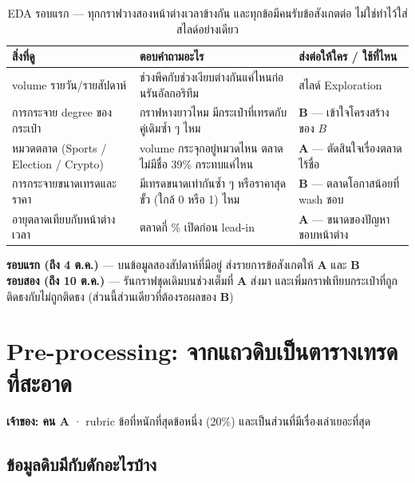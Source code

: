\documentclass[11pt,a4paper]{article}
\newcommand{\sansall}{\sffamily}
\newcommand{\en}[1]{#1}
\newcommand{\stg}[2]{\textcolor{#1}{\textbf{\en{#2}}}}
\newcommand{\rA}{\stg{accent}{A}}
\newcommand{\rB}{\stg{alg}{B}}
\newcommand{\thd}[1]{\sansall\bfseries #1}
\begin{document}
\begin{table}[H]
\centering\small
\begin{tabular}{L{3.6cm}L{5.8cm}L{4.8cm}}
\toprule
\thd{สิ่งที่ดู} & \thd{ตอบคำถามอะไร} & \thd{ส่งต่อให้ใคร / ใช้ที่ไหน} \\
\midrule
volume รายวัน/รายสัปดาห์ & ช่วงพีคกับช่วงเงียบต่างกันแค่ไหนก่อนรันอัลกอริทึม & สไลด์ Exploration \\
\addlinespace
การกระจาย degree ของกระเป๋า & กราฟหางยาวไหม มีกระเป๋าที่เทรดกับคู่เดิมซ้ำ ๆ ไหม & \rB{} --- เข้าใจโครงสร้างของ $B$ \\
\addlinespace
หมวดตลาด (Sports / Election / Crypto) & volume กระจุกอยู่หมวดไหน ตลาดไม่มีชื่อ 39\% กระทบแค่ไหน & \rA{} --- ตัดสินใจเรื่องตลาดไร้ชื่อ \\
\addlinespace
การกระจายขนาดเทรดและราคา & มีเทรดขนาดเท่ากันซ้ำ ๆ หรือราคาสุดขั้ว (ใกล้ 0 หรือ 1) ไหม & \rB{} --- ตลาดโอกาสน้อยที่ wash ชอบ \\
\addlinespace
อายุตลาดเทียบกับหน้าต่างเวลา & ตลาดกี่ \% เปิดก่อน lead-in & \rA{} --- ขนาดของปัญหาขอบหน้าต่าง \\
\bottomrule
\end{tabular}
\caption{EDA รอบแรก --- ทุกกราฟวางสองหน้าต่างเวลาข้างกัน
และทุกข้อมีคนรับข้อสังเกตต่อ ไม่ใช่ทำไว้ใส่สไลด์อย่างเดียว}
\end{table}

\begin{keybox}[title={EDA มีสองรอบ}]
\textbf{รอบแรก (ถึง 4 ต.ค.)} --- บนข้อมูลสองสัปดาห์ที่มีอยู่
ส่งรายการข้อสังเกตให้ \rA{} และ \rB{}\\[3pt]
\textbf{รอบสอง (ถึง 10 ต.ค.)} --- รันกราฟชุดเดิมบนช่วงเต็มที่ \rA{} ส่งมา
และเพิ่มกราฟเทียบกระเป๋าที่ถูกติดธงกับไม่ถูกติดธง (ส่วนนี้ส่วนเดียวที่ต้องรอผลของ \rB)
\end{keybox}

\section{Pre-processing: จากแถวดิบเป็นตารางเทรดที่สะอาด}
\label{sec:pre}

\textbf{เจ้าของ: คน \rA} · rubric ข้อที่หนักที่สุดข้อหนึ่ง (20\%) และเป็นส่วนที่มีเรื่องเล่าเยอะที่สุด

\subsection{ข้อมูลดิบมีกับดักอะไรบ้าง}
\end{document}
